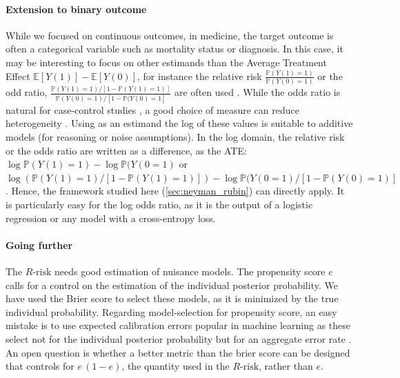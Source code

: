 \documentclass[10pt]{article}
\begin{document}
\begin{multicols}{2}
    \paragraph{Extension to binary outcome}
    While we focused on continuous outcomes, in medicine, the target outcome
    is often a categorical variable such as mortality status or diagnosis. In
    this case, it may be interesting to focus on other estimands than the
    Average Treatment Effect $\mathbb{E}[Y(1)] -\mathbb{E}[Y(0)] $, for instance the relative risk
    $\frac{\mathbb P(Y(1) = 1)}{\mathbb P(Y(0) = 1)}$
    or the odd ratio, $\frac{\mathbb P(Y(1) = 1) / [1 - \mathbb P(Y(1)
        =1)]}{\mathbb P(Y(0) = 1) / [1 - \mathbb P(Y(0) = 1]}$ are often used
    \cite{austin2017estimating}. While the odds ratio is natural for
    case-control studies \cite{rothman2008case}, a good choice of measure
    can reduce heterogeneity \cite{colnet2023risk}.
    Using as an estimand the log of
    these values is suitable to additive models (for reasoning or noise
    assumptions). In the log domain, the relative risk or the odds ratio are
    written as a difference, as the ATE: $\log \mathbb{P}(Y(1)=1) - \log
        \mathbb{P}(Y(0=1)$ or $\log (\mathbb{P}(Y(1)=1) / [1 -\mathbb{P}(Y(1)=1)]
        ) - \log \mathbb{P}(Y(0=1) / [1 -\mathbb{P}(Y(0)=1)]$. Hence, the
    framework studied here (\autoref{sec:neyman_rubin}) can directly apply.
    It is particularly easy for the log odds ratio, as it is the output of a
    logistic regression or any model with a cross-entropy loss.

    \paragraph{Going further}
    The $R\text{-risk}$ needs good estimation of nuisance models. The
    propensity score $e$ calls for a control on the estimation of the
    individual posterior probability. We have used the Brier score to select
    these models, as it is minimized by the true individual probability. Regarding model-selection for
    propensity score, an easy mistake is to use expected calibration errors
    popular in machine learning
    \cite{platt_probabilistic_1999,zadrozny_obtaining_2001,niculescu-mizil_predicting_2005,minderer_revisiting_2021}
    as these select not for the individual posterior probability but for an
    aggregate error rate \cite{perez2022beyond}. An
    open question is whether a better metric than the brier score can be designed that controls for $e \, (1 - e)$, the quantity used in
    the $R\text{-risk}$, rather than $e$.


\end{multicols}
\end{document}
